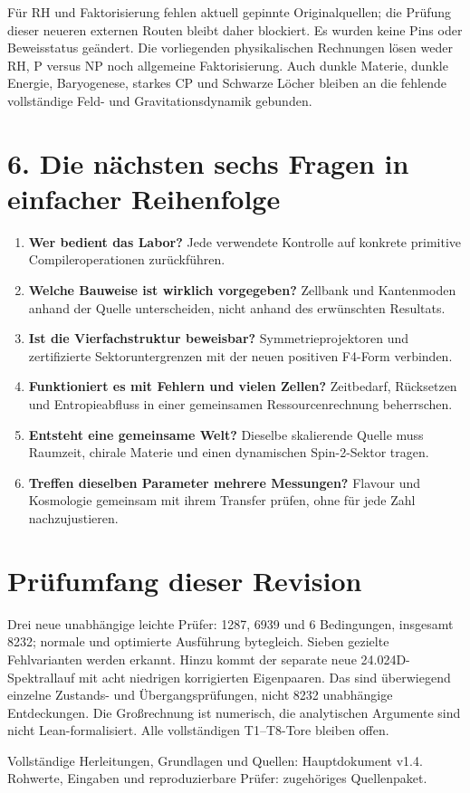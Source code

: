 Für RH und Faktorisierung fehlen aktuell gepinnte Originalquellen; die Prüfung dieser neueren externen Routen bleibt daher blockiert. Es wurden keine Pins oder Beweisstatus geändert. Die vorliegenden physikalischen Rechnungen lösen weder RH, P versus NP noch allgemeine Faktorisierung. Auch dunkle Materie, dunkle Energie, Baryogenese, starkes CP und Schwarze Löcher bleiben an die fehlende vollständige Feld- und Gravitationsdynamik gebunden.

\section*{6. Die nächsten sechs Fragen in einfacher Reihenfolge}
\begin{enumerate}
\item \textbf{Wer bedient das Labor?} Jede verwendete Kontrolle auf konkrete primitive Compileroperationen zurückführen.
\item \textbf{Welche Bauweise ist wirklich vorgegeben?} Zellbank und Kantenmoden anhand der Quelle unterscheiden, nicht anhand des erwünschten Resultats.
\item \textbf{Ist die Vierfachstruktur beweisbar?} Symmetrieprojektoren und zertifizierte Sektoruntergrenzen mit der neuen positiven F4-Form verbinden.
\item \textbf{Funktioniert es mit Fehlern und vielen Zellen?} Zeitbedarf, Rücksetzen und Entropieabfluss in einer gemeinsamen Ressourcenrechnung beherrschen.
\item \textbf{Entsteht eine gemeinsame Welt?} Dieselbe skalierende Quelle muss Raumzeit, chirale Materie und einen dynamischen Spin-2-Sektor tragen.
\item \textbf{Treffen dieselben Parameter mehrere Messungen?} Flavour und Kosmologie gemeinsam mit ihrem Transfer prüfen, ohne für jede Zahl nachzujustieren.
\end{enumerate}

\section*{Prüfumfang dieser Revision}
Drei neue unabhängige leichte Prüfer: 1287, 6939 und 6 Bedingungen, insgesamt 8232; normale und optimierte Ausführung bytegleich. Sieben gezielte Fehlvarianten werden erkannt. Hinzu kommt der separate neue 24.024D-Spektrallauf mit acht niedrigen korrigierten Eigenpaaren. Das sind überwiegend einzelne Zustands- und Übergangsprüfungen, nicht 8232 unabhängige Entdeckungen. Die Großrechnung ist numerisch, die analytischen Argumente sind nicht Lean-formalisiert. Alle vollständigen T1--T8-Tore bleiben offen.

\noindent\textsf{Vollständige Herleitungen, Grundlagen und Quellen: Hauptdokument v1.4. Rohwerte, Eingaben und reproduzierbare Prüfer: zugehöriges Quellenpaket.}
